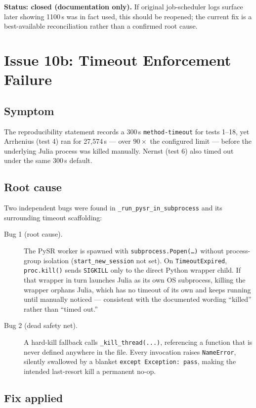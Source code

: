\documentclass[11pt]{article}
\begin{document}
\textbf{Status: closed (documentation only).} If original job-scheduler
logs surface later showing 1100\,s was in fact used, this should be
reopened; the current fix is a best-available reconciliation rather than a
confirmed root cause.

\section{Issue 10b: Timeout Enforcement Failure}
\label{sec:10b}

\subsection{Symptom}

The reproducibility statement records a 300\,s \texttt{method-timeout} for
tests 1--18, yet Arrhenius (test 4) ran for 27{,}574\,s — over $90\times$
the configured limit — before the underlying Julia process was killed
manually. Nernst (test 6) also timed out under the same 300\,s default.

\subsection{Root cause}

Two independent bugs were found in \texttt{\_run\_pysr\_in\_subprocess}
and its surrounding timeout scaffolding:

\begin{description}
\item[Bug 1 (root cause).] The PySR worker is spawned with
\texttt{subprocess.Popen(\ldots)} without process-group isolation
(\texttt{start\_new\_session} not set). On \texttt{TimeoutExpired},
\texttt{proc.kill()} sends \texttt{SIGKILL} only to the direct Python
wrapper child. If that wrapper in turn launches Julia as its own OS
subprocess, killing the wrapper orphans Julia, which has no timeout of
its own and keeps running until manually noticed — consistent with the
documented wording ``killed'' rather than ``timed out.''
\item[Bug 2 (dead safety net).] A hard-kill fallback calls
\texttt{\_kill\_thread(...)}, referencing a function that is never
defined anywhere in the file. Every invocation raises
\texttt{NameError}, silently swallowed by a blanket
\texttt{except~Exception:~pass}, making the intended last-resort kill a
permanent no-op.
\end{description}

\subsection{Fix applied}
\end{document}
